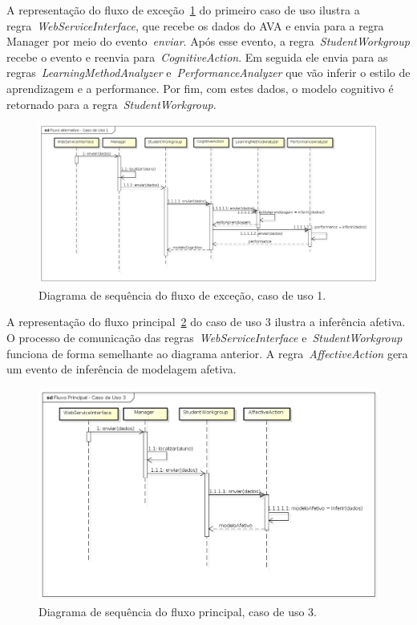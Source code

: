 A representação do fluxo de exceção~\ref{fig:dss-uc1-fluxo-alternativo} do primeiro caso de uso ilustra a regra~\emph{WebServiceInterface}, que recebe os dados do AVA e envia para a regra Manager por meio do evento~\emph{enviar}. Após esse evento, a regra~\emph{StudentWorkgroup} recebe o evento e reenvia para~\emph{CognitiveAction}. Em seguida ele envia para as regras~\emph{LearningMethodAnalyzer} e~\emph{PerformanceAnalyzer} que vão inferir o estilo de aprendizagem e a performance. Por fim, com estes dados, o modelo cognitivo é retornado para a regra~\emph{StudentWorkgroup}.

\begin{figure}
	\centering
	\includegraphics[scale=0.4]{images/dss-uc1-fluxo-alternativo}
	\caption{Diagrama de sequência do fluxo de exceção, caso de uso 1.}
	\label{fig:dss-uc1-fluxo-alternativo}
\end{figure}

A representação do fluxo principal~\ref{fig:dss-uc3-fluxo-principal} do caso de uso 3 ilustra a inferência afetiva. O processo de comunicação das regras~\emph{WebServiceInterface} e~\emph{StudentWorkgroup} funciona de forma semelhante ao diagrama anterior. A regra~\emph{AffectiveAction} gera um evento de inferência de modelagem afetiva.

\begin{figure}
	\centering
	\includegraphics[scale=0.48]{images/dss-uc3-fluxo-principal.png}
	\caption{Diagrama de sequência do fluxo principal, caso de uso 3.}
	\label{fig:dss-uc3-fluxo-principal}
\end{figure}


